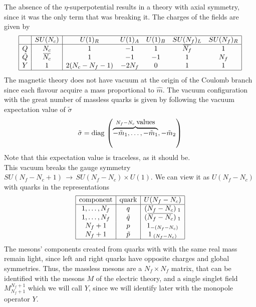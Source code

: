 The absence of the $\eta$-superpotential results in a theory with axial symmetry, since it was the only term that was breaking it.
The charges of the fields are given by
\begin{equation}
\begin{array}{| c | c | c c c c c| }
 \hline 
  & SU(N_c) & U(1)_R & U(1)_A & U(1)_B  & SU(N_f)_L & SU(N_f)_R \\
 \hline

 Q &N_c & 1 & -1 & 1 & \overbar{N_f} & 1 \\  
 \tilde{Q}& \overbar{N_c} & 1  & -1 & -1  & 1 & {N_f}  \\  
 Y & 1 & 2(N_c - N_f -1 ) & -2 N_f  & 0 &  1 & 1 \\
 \hline
\end{array}
\end{equation}
The magnetic theory does not have vacuum at the origin of the Coulomb branch since each flavour acquire a mass proportional to $\hat{m}$.
The vacuum configuration with the great number of massless quarks is given by following the vacuum expectation value of $\tilde{\sigma}$
\begin{equation}
  \tilde{\sigma} = \hbox{diag\,} \left( \overbrace{- \tilde{m}_1, \dotsc,-\tilde{m}_1}^{N_f - N_c \; \hbox{values}}, -\tilde{m}_2  \right)
 \end{equation}
Note that this expectation value is traceless, as it should be.\\
This vacuum breaks the gauge symmetry $SU(N_f-N_c + 1) \, \rightarrow \, SU(N_f - N_c) \times U(1)$. 
We can view it as $U(N_f - N_c)$ with quarks in the representations
\begin{equation}
\begin{array} { | c | c | c | }
 \hline
 \hbox{component}& \hbox{quark} & U(N_f - N_c)  \\
\hline
1,\dotsc,N_f & q & (N_f - N_c)_{\;1}\\
1,\dotsc,N_f & \tilde{q} & (\overbar{N_f - N_c})_{\;1}\\
N_f +1 & p & 1_{-(N_f-N_c)}\\
N_f +1 & \tilde{p} & 1_{\;(N_f-N_c)}\\ 
\hline
\end{array}
\end{equation}
The mesons' components created from quarks with with the same real mass remain light, since left and right quarks have opposite charges and global symmetries. 
Thus, the massless mesons are a $N_f \times N_f$ matrix, that can be identified with the mesons $M$ of the electric theory, and a single singlet field $M^{N_f+1}_{N_f+1}$ which we will call $Y$, since we will identify later with the monopole operator $Y$.\\
